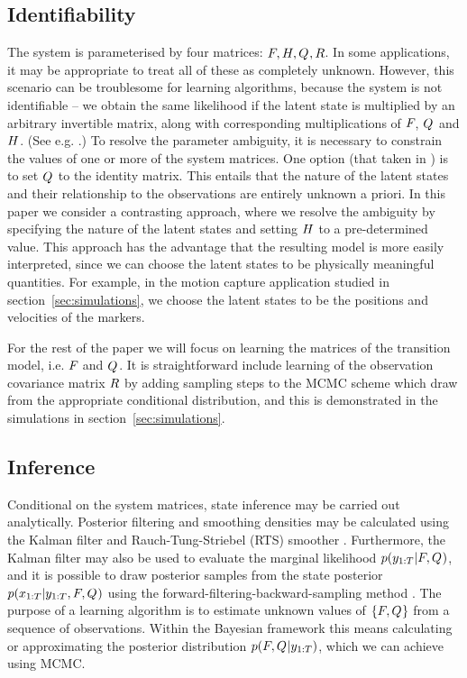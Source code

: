 \documentclass[journal,10pt]{IEEEtran}
\begin{document}
\subsection{Identifiability}
The system is parameterised by four matrices: $F_{}, H, Q_{}, R$. In some applications, it may be appropriate to treat all of these as completely unknown. However, this scenario can be troublesome for learning algorithms, because the system is not identifiable -- we obtain the same likelihood if the latent state is multiplied by an arbitrary invertible matrix, along with corresponding multiplications of $F_{}$, $Q_{}$ and $H$. (See e.g. \cite{Roweis1999}.) To resolve the parameter ambiguity, it is necessary to constrain the values of one or more of the system matrices. One option (that taken in \cite{Roweis1999}) is to set $Q_{}$ to the identity matrix. This entails that the nature of the latent states and their relationship to the observations are entirely unknown a priori. In this paper we consider a contrasting approach, where we resolve the ambiguity by specifying the nature of the latent states and setting $H$ to a pre-determined value. This approach has the advantage that the resulting model is more easily interpreted, since we can choose the latent states to be physically meaningful quantities. For example, in the motion capture application studied in section~\ref{sec:simulations}, we choose the latent states to be the positions and velocities of the markers.

For the rest of the paper we will focus on learning the matrices of the transition model, i.e. $F_{}$ and $Q_{}$. It is straightforward include learning of the observation covariance matrix $R$ by adding sampling steps to the MCMC scheme which draw from the appropriate conditional distribution, and this is demonstrated in the simulations in section~\ref{sec:simulations}.

\subsection{Inference}
Conditional on the system matrices, state inference may be carried out analytically. Posterior filtering and smoothing densities may be calculated using the Kalman filter \cite{Kalman1960} and Rauch-Tung-Striebel (RTS) smoother \cite{Rauch1965}. Furthermore, the Kalman filter may also be used to evaluate the marginal likelihood $p(y_{1:T}|F_{}, Q_{})$, and it is possible to draw posterior samples from the state posterior $p(x_{1:T}|y_{1:T}, F_{}, Q_{})$ using the forward-filtering-backward-sampling method \cite{Chib1996}. The purpose of a learning algorithm is to estimate unknown values of $\left\{F_{}, Q_{}\right\}$ from a sequence of observations. Within the Bayesian framework this means calculating or approximating the posterior distribution $p(F_{}, Q_{}|y_{1:T})$, which we can achieve using MCMC. 
\end{document}
